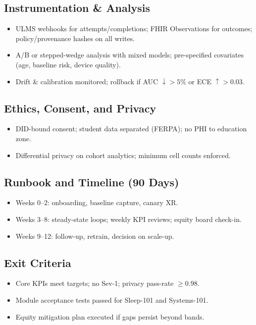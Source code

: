 \documentclass[11pt]{article}
\theoremstyle{plain}
\begin{document}
\subsection{Instrumentation \& Analysis}
\begin{itemize}
  \item ULMS webhooks for attempts/completions; FHIR Observations for outcomes; policy/provenance hashes on all writes.
  \item A/B or stepped-wedge analysis with mixed models; pre-specified covariates (age, baseline risk, device quality).
  \item Drift \& calibration monitored; rollback if AUC \(\downarrow >5\%\) or ECE \(\uparrow >0.03\).
\end{itemize}

\subsection{Ethics, Consent, and Privacy}
\begin{itemize}
  \item DID-bound consent; student data separated (FERPA); no PHI to education zone.
  \item Differential privacy on cohort analytics; minimum cell counts enforced.
\end{itemize}

\subsection{Runbook and Timeline (90 Days)}
\begin{itemize}
  \item Weeks 0--2: onboarding, baseline capture, canary XR.
  \item Weeks 3--8: steady-state loops; weekly KPI reviews; equity board check-in.
  \item Weeks 9--12: follow-up, retrain, decision on scale-up.
\end{itemize}

\subsection{Exit Criteria}
\begin{itemize}
  \item Core KPIs meet targets; no Sev-1; privacy pass-rate \(\ge 0.98\).
  \item Module acceptance tests passed for Sleep-101 and Systems-101.
  \item Equity mitigation plan executed if gaps persist beyond bands.
\end{itemize}
\end{document}

